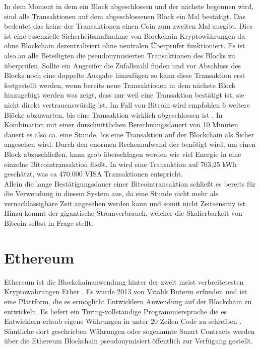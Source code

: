 \documentclass{scrreprt}
\begin{document}
In dem Moment in dem ein Block abgeschlossen und der nächste begonnen wird, sind alle Transaktionen auf dem abgeschlossenen Block ein Mal bestätigt. Das bedeutet das keine der Transaktionen einen Coin zum zweiten Mal ausgibt. Dies ist eine essenzielle Sicherheitsmaßnahme von Blockchain Kryptowährungen da ohne Blockchain dezentralisiert ohne neutralen Überprüfer funktioniert. Es ist also an alle Beteiligten die pseudonymisierten Transaktionen des Blocks zu überprüfen. Sollte ein Angreifer die Zufallszahl finden und vor Abschluss des Blocks noch eine doppelte Ausgabe hinzufügen so kann diese Transaktion erst festgestellt werden, wenn bereits neue Transaktionen in dem nächste Block hinzugefügt werden was zeigt, dass nur weil eine Transaktion bestätigt ist, sie nicht direkt vertrauenswürdig ist. Im Fall von Bitcoin wird empfohlen 6 weitere Blöcke abzuwarten, bis eine Transaktion wirklich abgeschlossen ist \cite{btc-Zaghloul2019Bitcoin}. In Kombination mit einer durschnittlichen Berechnungsdauert von 10 Minuten dauert es also ca. eine Stunde, bis eine Transaktion auf der Blockchain als Sicher angesehen wird.
Durch den enormen Rechenaufwand der benötigt wird, um einen Block abzuschließen, kann grob überschlagen werden wie viel Energie in eine einzelne Bitcointransaktion fließt. In \cite{btc-energyConsumption} wird eine Transaktion auf 703,25 kWh geschätzt, was ca 470.000 VISA Transaktionen entspricht.\\

Allein die lange Bestätigungsdauer einer Bitcointransaktion schließt es bereits für die Verwendung in diesem System aus, da eine Stunde nicht mehr als vernachlässigbare Zeit angesehen werden kann und somit nicht Zeitsensitiv ist. Hinzu kommt der gigantische Stromverbrauch, welcher die Skalierbarkeit von Bitcoin selbst in Frage stellt. 


\section{Ethereum}
\label{sec:ethereum}
Ethereum ist die Blockchainanwendung hinter der zweit meist verbreitetesten Kryptowährungen Ether \cite{eth-marketCapitalisation}. Es wurde 2013 von Vitalik Buterin erfunden und ist eine Plattform, die es ermöglicht Entwicklern Anwendung auf der Blockchain zu entwickeln. Es liefert ein Turing-vollständige Programmiersprache die es Entwicklern erlaub eigene Währungen in unter 20 Zeilen Code zu schreiben \cite{eth-buterin2013ethereum}. Sämtliche dort geschrieben Währungen oder sogenannte Smart Contracts werden über die Ethereum Blockchain pseudonymisiert öffentlich zur Verfügung gestellt. 
\end{document}
